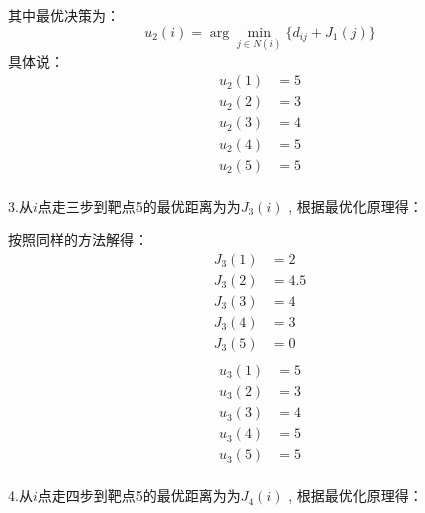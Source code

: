 \begin{example}
    其中最优决策为：
    \begin{equation}
        u_2(i)=\arg \min_{j\in N(i)}\{d_{ij}+J_1(j)\}
    \end{equation}
    具体说：
    \begin{equation}
        \begin{aligned}
            u_2(1) & = 5 \\
            u_2(2) & = 3 \\
            u_2(3) & = 4 \\
            u_2(4) & = 5 \\
            u_2(5) & = 5 \\
        \end{aligned}
    \end{equation}

    3.从$i$点走三步到靶点5的最优距离为为$J_3(i)$ , 根据最优化原理得：

    按照同样的方法解得：
    \begin{equation}
        \begin{aligned}
            J_3(1) & = 2   \\
            J_3(2) & = 4.5 \\
            J_3(3) & = 4   \\
            J_3(4) & = 3   \\
            J_3(5) & = 0   \\
        \end{aligned}
    \end{equation}
    \begin{equation}
        \begin{aligned}
            u_3(1) & = 5 \\
            u_3(2) & = 3 \\
            u_3(3) & = 4 \\
            u_3(4) & = 5 \\
            u_3(5) & = 5 \\
        \end{aligned}
    \end{equation}

    4.从$i$点走四步到靶点5的最优距离为为$J_4(i)$ , 根据最优化原理得：


\end{example}
